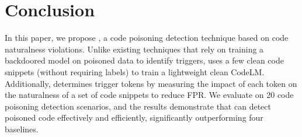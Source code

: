 \section{Conclusion}
\label{sec:conclusion}
In this paper, we propose \ours{}, a code poisoning detection technique based on code naturalness violations. Unlike existing techniques that rely on training a backdoored model on poisoned data to identify triggers, \ours{} uses a few clean code snippets (without requiring labels) to train a lightweight clean CodeLM. 
Additionally, \ours{} determines trigger tokens by measuring the impact of each token on the naturalness of a set of code snippets to reduce FPR. 
We evaluate \ours{} on 20 code poisoning detection scenarios, and the results demonstrate that \ours{} can detect poisoned code effectively and efficiently, significantly outperforming four baselines. 
